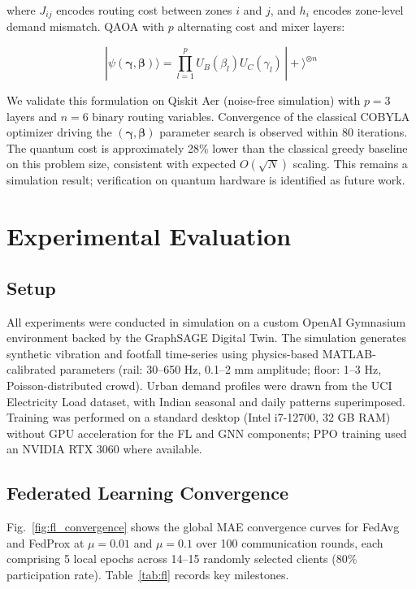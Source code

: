 \documentclass[conference]{IEEEtran}
\begin{document}
where $J_{ij}$ encodes routing cost between zones $i$ and $j$, and $h_i$ encodes zone-level demand mismatch. QAOA with $p$ alternating cost and mixer layers:

\begin{equation}
|\psi(\boldsymbol{\gamma}, \boldsymbol{\beta})\rangle = \prod_{l=1}^{p} U_B(\beta_l) U_C(\gamma_l) \, |+\rangle^{\otimes n}
\label{eq:qaoa}
\end{equation}

We validate this formulation on Qiskit Aer (noise-free simulation) with $p=3$ layers and $n=6$ binary routing variables. Convergence of the classical COBYLA optimizer driving the $(\boldsymbol{\gamma}, \boldsymbol{\beta})$ parameter search is observed within 80 iterations. The quantum cost is approximately 28\% lower than the classical greedy baseline on this problem size, consistent with expected $O(\sqrt{N})$ scaling. This remains a simulation result; verification on quantum hardware is identified as future work.

\section{Experimental Evaluation}

\subsection{Setup}

All experiments were conducted in simulation on a custom OpenAI Gymnasium environment backed by the GraphSAGE Digital Twin. The simulation generates synthetic vibration and footfall time-series using physics-based MATLAB-calibrated parameters (rail: 30--650 Hz, 0.1--2 mm amplitude; floor: 1--3 Hz, Poisson-distributed crowd). Urban demand profiles were drawn from the UCI Electricity Load dataset, with Indian seasonal and daily patterns superimposed. Training was performed on a standard desktop (Intel i7-12700, 32 GB RAM) without GPU acceleration for the FL and GNN components; PPO training used an NVIDIA RTX 3060 where available.

\subsection{Federated Learning Convergence}

Fig.~\ref{fig:fl_convergence} shows the global MAE convergence curves for FedAvg and FedProx at $\mu=0.01$ and $\mu=0.1$ over 100 communication rounds, each comprising 5 local epochs across 14--15 randomly selected clients (80\% participation rate). Table~\ref{tab:fl} records key milestones.
\end{document}
